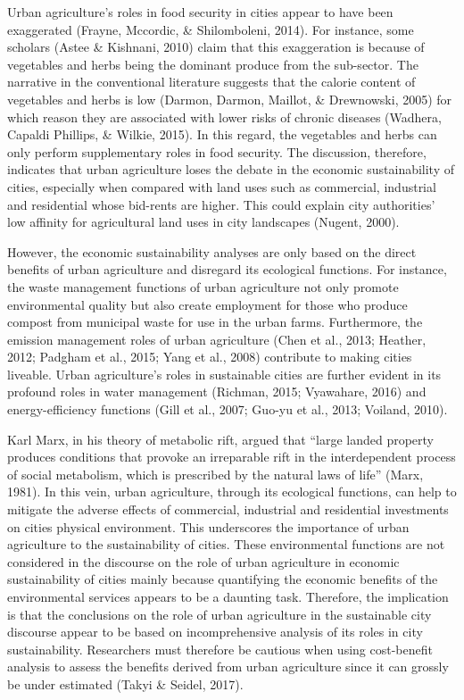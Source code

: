 Urban agriculture's roles in food security in cities appear to have been exaggerated (Frayne, Mccordic, \& Shilomboleni, 2014). For instance, some scholars \cite{Amponsah2016a} (Astee \& Kishnani, 2010) claim that this exaggeration is because of vegetables and herbs being the dominant produce from the sub-sector. The narrative in the conventional literature suggests that the calorie content of vegetables and herbs is low (Darmon, Darmon, Maillot, \& Drewnowski, 2005) for which reason they are associated with lower risks of chronic diseases (Wadhera, Capaldi Phillips, \& Wilkie, 2015). In this regard, the vegetables and herbs can only perform supplementary roles in food security. The discussion, therefore, indicates that urban agriculture loses the debate in the economic sustainability of cities, especially when compared with land uses such as commercial, industrial and residential whose bid-rents are higher. This could explain city authorities' low affinity for agricultural land uses in city landscapes (Nugent, 2000).

However, the economic sustainability analyses are only based on the direct benefits of urban agriculture and disregard its ecological functions. For instance, the waste management functions of urban agriculture not only promote environmental quality but also create employment for those who produce compost from municipal waste for use in the urban farms. Furthermore, the emission management roles of urban agriculture (Chen et al., 2013; Heather, 2012; Padgham et al., 2015; Yang et al., 2008) contribute to making cities liveable. Urban agriculture's roles in sustainable cities are further evident in its profound roles in water management (Richman, 2015; Vyawahare, 2016) and energy-efficiency functions (Gill et al., 2007; Guo-yu et al., 2013; Voiland, 2010).

Karl Marx, in his theory of metabolic rift, argued that “large landed property produces conditions that provoke an irreparable rift in the interdependent process of social metabolism, which is prescribed by the natural laws of life” (Marx, 1981). In this vein, urban agriculture, through its ecological functions, can help to mitigate the adverse effects of commercial, industrial and residential investments on cities physical environment. This underscores the importance of urban agriculture to the sustainability of cities. These environmental functions are not considered in the discourse on the role of urban agriculture in economic sustainability of cities mainly because quantifying the economic benefits of the environmental services appears to be a daunting task. Therefore, the implication is that the conclusions on the role of urban agriculture in the sustainable city discourse appear to be based on incomprehensive analysis of its roles in city sustainability. Researchers must therefore be cautious when using cost-benefit analysis to assess the benefits derived from urban agriculture since it can grossly be under estimated (Takyi \& Seidel, 2017).

